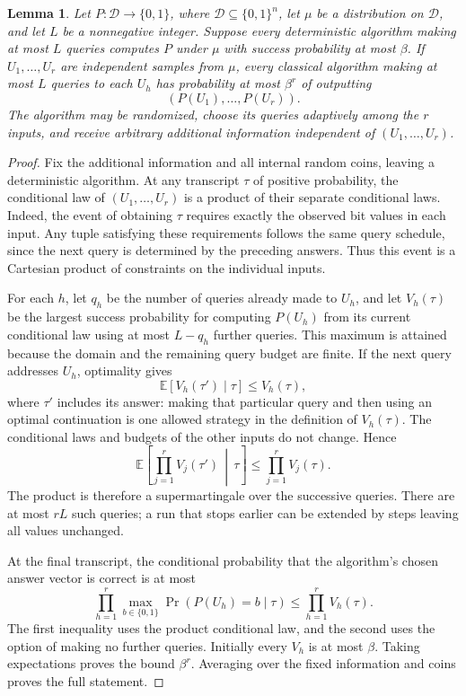 \documentclass[11pt]{article}
\newtheorem{lemma}[theorem]{Lemma}
\theoremstyle{definition}
\newcommand{\bits}{\{0,1\}}
\begin{document}
\begin{lemma}\label{lem:adaptive-product}
Let $P\colon\mathcal D\to\bits$, where $\mathcal D\subseteq\bits^n$, let
$\mu$ be a distribution on $\mathcal D$, and let $L$ be a nonnegative
integer.  Suppose every deterministic algorithm making at most $L$
queries computes $P$ under $\mu$ with success probability at most $\beta$.
If $U_1,\ldots,U_r$ are independent samples from $\mu$, every classical
algorithm making at most $L$ queries to each $U_h$ has probability at most
$\beta^r$ of outputting
\[
 (P(U_1),\ldots,P(U_r)).
\]
The algorithm may be randomized, choose its queries adaptively among the
$r$ inputs, and receive arbitrary additional information independent of
$(U_1,\ldots,U_r)$.
\end{lemma}

\begin{proof}
Fix the additional information and all internal random coins, leaving a
deterministic algorithm.  At any transcript $\tau$ of positive
probability, the conditional law of $(U_1,\ldots,U_r)$ is a product of
their separate conditional laws.  Indeed, the event of obtaining $\tau$
requires exactly the observed bit values in each input.  Any tuple
satisfying these requirements follows the same query schedule, since
the next query is determined by the preceding answers.  Thus this event
is a Cartesian product of constraints on the individual inputs.

For each $h$, let $q_h$ be the number of queries already made to $U_h$,
and let $V_h(\tau)$ be the largest success probability for computing
$P(U_h)$ from its current conditional law using at most $L-q_h$ further
queries.  This maximum is attained because the domain and the remaining
query budget are finite.  If the next query addresses $U_h$, optimality
gives
\begin{equation}\label{eq:bellman-query}
 \mathbb E[V_h(\tau')\mid\tau]\leq V_h(\tau),
\end{equation}
where $\tau'$ includes its answer: making that particular query and
then using an optimal continuation is one allowed strategy in the
definition of $V_h(\tau)$.  The conditional laws and budgets of the
other inputs do not change.  Hence
\[
 \mathbb E\!\left[
   \prod_{j=1}^r V_j(\tau')\,\middle|\,\tau
 \right]
 \leq \prod_{j=1}^r V_j(\tau).
\]
The product is therefore a supermartingale over the successive queries.
There are at most $rL$ such queries; a run that stops earlier can be
extended by steps leaving all values unchanged.

At the final transcript, the conditional probability that the algorithm's
chosen answer vector is correct is at most
\[
 \prod_{h=1}^r
   \max_{b\in\bits}\Pr(P(U_h)=b\mid\tau)
 \leq \prod_{h=1}^r V_h(\tau).
\]
The first inequality uses the product conditional law, and the second
uses the option of making no further queries.  Initially every $V_h$
is at most $\beta$.  Taking expectations proves the bound $\beta^r$.
Averaging over the fixed information and coins proves the full statement.
\end{proof}
\end{document}
